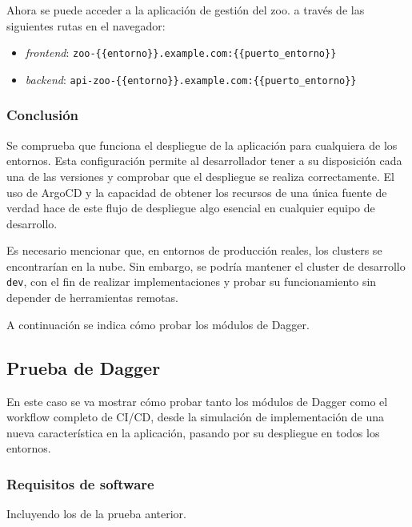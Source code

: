 \begin{enumerate}
    Ahora se puede acceder a la aplicación de gestión del zoo. a través de las siguientes rutas en el navegador:

    \begin{itemize}
      \item \textit{frontend}: \texttt{zoo-\{\{entorno\}\}.example.com:\{\{puerto\_entorno\}\}}
      \item \textit{backend}: \texttt{api-zoo-\{\{entorno\}\}.example.com:\{\{puerto\_entorno\}\}}
    \end{itemize}

\end{enumerate}

\subsubsection*{Conclusión}

Se comprueba que funciona el despliegue de la aplicación para cualquiera de los entornos. Esta configuración permite al desarrollador tener a su disposición cada una de las versiones y comprobar que el despliegue se realiza correctamente. El uso de ArgoCD y la capacidad de obtener los recursos de una única fuente de verdad hace de este flujo de despliegue algo esencial en cualquier equipo de desarrollo.

Es necesario mencionar que, en entornos de producción reales, los clusters se encontrarían en la nube. Sin embargo, se podría mantener el cluster de desarrollo \texttt{dev}, con el fin de realizar implementaciones y probar su funcionamiento sin depender de herramientas remotas.

A continuación se indica cómo probar los módulos de Dagger.

\subsection*{Prueba de Dagger}

En este caso se va mostrar cómo probar tanto los módulos de Dagger como el workflow completo de CI/CD, desde la simulación de implementación de una nueva característica en la aplicación, pasando por su despliegue en todos los entornos.

\subsubsection*{Requisitos de software}

Incluyendo los de la prueba anterior.

